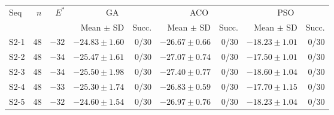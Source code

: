 \begin{tabular}{lrrrrrrrr}
\toprule
Seq & $n$ & $E^*$ & \multicolumn{2}{c}{GA} & \multicolumn{2}{c}{ACO} & \multicolumn{2}{c}{PSO} \\
\cmidrule(lr){4-5} \cmidrule(lr){6-7} \cmidrule(lr){8-9}
 & & & Mean $\pm$ SD & Succ. & Mean $\pm$ SD & Succ. & Mean $\pm$ SD & Succ. \\
\midrule
S2-1 & 48 & $-32$ & $-24.83 \pm 1.60$ & 0/30 & {\boldmath$-26.67 \pm 0.66$} & 0/30 & $-18.23 \pm 1.01$ & 0/30 \\
S2-2 & 48 & $-34$ & $-25.47 \pm 1.61$ & 0/30 & {\boldmath$-27.07 \pm 0.74$} & 0/30 & $-17.50 \pm 1.01$ & 0/30 \\
S2-3 & 48 & $-34$ & $-25.50 \pm 1.98$ & 0/30 & {\boldmath$-27.40 \pm 0.77$} & 0/30 & $-18.60 \pm 1.04$ & 0/30 \\
S2-4 & 48 & $-33$ & $-25.30 \pm 1.74$ & 0/30 & {\boldmath$-26.83 \pm 0.59$} & 0/30 & $-17.70 \pm 1.15$ & 0/30 \\
S2-5 & 48 & $-32$ & $-24.60 \pm 1.54$ & 0/30 & {\boldmath$-26.97 \pm 0.76$} & 0/30 & $-18.23 \pm 1.04$ & 0/30 \\
\bottomrule
\end{tabular}
